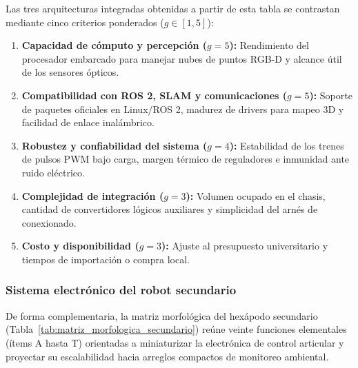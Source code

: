 Las tres arquitecturas integradas obtenidas a partir de esta tabla se contrastan mediante cinco criterios ponderados ($g \in [1,5]$):

\begin{enumerate}
    \item \textbf{Capacidad de cómputo y percepción ($g = 5$):} Rendimiento del procesador embarcado para manejar nubes de puntos RGB-D y alcance útil de los sensores ópticos.
    \item \textbf{Compatibilidad con ROS 2, SLAM y comunicaciones ($g = 5$):} Soporte de paquetes oficiales en Linux/ROS 2, madurez de drivers para mapeo 3D y facilidad de enlace inalámbrico.
    \item \textbf{Robustez y confiabilidad del sistema ($g = 4$):} Estabilidad de los trenes de pulsos PWM bajo carga, margen térmico de reguladores e inmunidad ante ruido eléctrico.
    \item \textbf{Complejidad de integración ($g = 3$):} Volumen ocupado en el chasis, cantidad de convertidores lógicos auxiliares y simplicidad del arnés de conexionado.
    \item \textbf{Costo y disponibilidad ($g = 3$):} Ajuste al presupuesto universitario y tiempos de importación o compra local.
\end{enumerate}

\subsubsection{Sistema electrónico del robot secundario}

De forma complementaria, la matriz morfológica del hexápodo secundario (Tabla~\ref{tab:matriz_morfologica_secundario}) reúne veinte funciones elementales (ítems A hasta T) orientadas a miniaturizar la electrónica de control articular y proyectar su escalabilidad hacia arreglos compactos de monitoreo ambiental.

